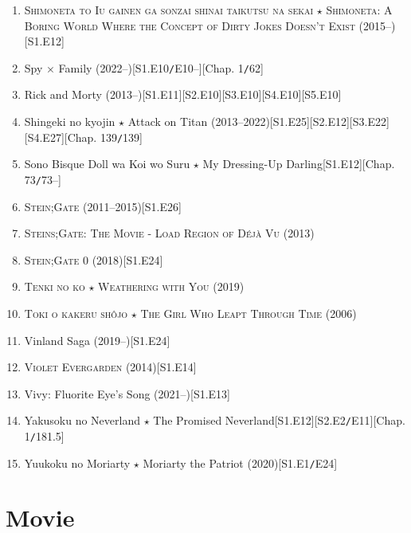 \documentclass[oneside]{book}
\numberwithin{equation}{section}
\begin{document}
\begin{enumerate}
    Rascal Does Not Dream of Bunny Girl Senpai (2018--)\hfill[S1.E14]
    \item \textsc{Shimoneta to Iu gainen ga sonzai shinai taikutsu na sekai $\star$ Shimoneta: A Boring World Where the Concept of Dirty Jokes Doesn't Exist} (2015--)\hfill[S1.E12]
    \item Spy $\times$ Family (2022--)\hfill[S1.E10\texttt{/}E10--][Chap. 1\texttt{/}62]
    \item Rick and Morty (2013--)\hfill[S1.E11][S2.E10][S3.E10][S4.E10][S5.E10]
    \item Shingeki no kyojin $\star$ Attack on Titan (2013--2022)\hfill[S1.E25][S2.E12][S3.E22][S4.E27][Chap. 139\texttt{/}139]
    \item Sono Bisque Doll wa Koi wo Suru $\star$ My Dressing-Up Darling\hfill[S1.E12][Chap. 73\texttt{/}73--]
    \item \textsc{Stein;Gate} (2011--2015)\hfill[S1.E26]
    \item \textsc{Steins;Gate: The Movie - Load Region of Déjà Vu} (2013)
    \item \textsc{Stein;Gate 0} (2018)\hfill[S1.E24]
    \item \textsc{Tenki no ko $\star$ Weathering with You} (2019)
    \item \textsc{Toki o kakeru sh\^ojo $\star$ The Girl Who Leapt Through Time} (2006)
    \item Vinland Saga (2019--)\hfill[S1.E24]
    \item \textsc{Violet Evergarden} (2014)\hfill[S1.E14]
    \item Vivy: Fluorite Eye's Song (2021--)\hfill[S1.E13]
    \item Yakusoku no Neverland $\star$ The Promised Neverland\hfill[S1.E12][S2.E2\texttt{/}E11][Chap. 1\texttt{/}181.5]
    \item Yuukoku no Moriarty $\star$ Moriarty the Patriot (2020)\hfill[S1.E1\texttt{/}E24]
\end{enumerate}


\chapter{Movie}
\end{document}
